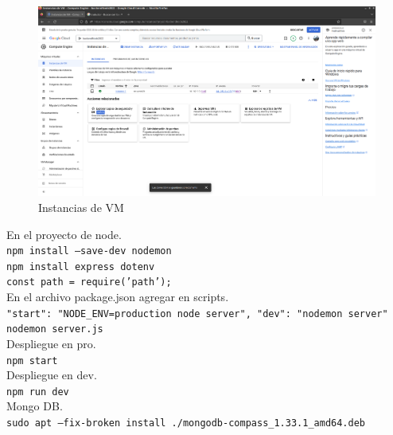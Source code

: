 \begin{figure}[H] %
	\centering %
	\includegraphics[scale=0.3]{images/c4_9.png}
	\caption{Instancias de VM}
\end{figure}


En el proyecto de node.\\
\texttt{npm install --save-dev nodemon}\\
\texttt{npm install express dotenv}\\
\texttt{const path = require('path');}\\
En el archivo package.json agregar en scripts.\\
\texttt{"start": "NODE\_ENV=production node server",
	"dev": "nodemon server"}\\

\texttt{nodemon server.js}\\

Despliegue en pro.\\
\texttt{npm start}\\
Despliegue en dev.\\
\texttt{npm run dev}\\

Mongo DB.\\
\texttt{sudo apt --fix-broken install ./mongodb-compass\_1.33.1\_amd64.deb}\\